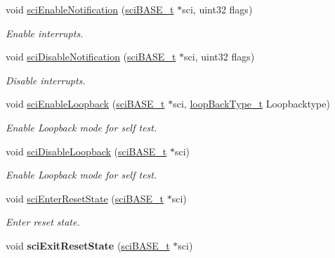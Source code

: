 \begin{DoxyCompactItemize}
void \mbox{\hyperlink{group__SCI_gad14ca1b90c313254407d318eceaa1f46}{sci\+Enable\+Notification}} (\mbox{\hyperlink{reg__sci_8h_ad5e2af74efb062728408d4ac1b7735db}{sci\+B\+A\+S\+E\+\_\+t}} $\ast$sci, uint32 flags)
\begin{DoxyCompactList}\small\item\em Enable interrupts. \end{DoxyCompactList}\item 
void \mbox{\hyperlink{group__SCI_ga9f1a39a5272682dbd101ddcbbbdc8193}{sci\+Disable\+Notification}} (\mbox{\hyperlink{reg__sci_8h_ad5e2af74efb062728408d4ac1b7735db}{sci\+B\+A\+S\+E\+\_\+t}} $\ast$sci, uint32 flags)
\begin{DoxyCompactList}\small\item\em Disable interrupts. \end{DoxyCompactList}\item 
void \mbox{\hyperlink{group__SCI_ga36302e2a67c26b3557c66ccb267c1760}{sci\+Enable\+Loopback}} (\mbox{\hyperlink{reg__sci_8h_ad5e2af74efb062728408d4ac1b7735db}{sci\+B\+A\+S\+E\+\_\+t}} $\ast$sci, \mbox{\hyperlink{sys__common_8h_aa61c8f392939c8448c7e3f17a3ecb51c}{loop\+Back\+Type\+\_\+t}} Loopbacktype)
\begin{DoxyCompactList}\small\item\em Enable Loopback mode for self test. \end{DoxyCompactList}\item 
void \mbox{\hyperlink{group__SCI_gae6568eda24f29b1b31bd09a5f665b5f8}{sci\+Disable\+Loopback}} (\mbox{\hyperlink{reg__sci_8h_ad5e2af74efb062728408d4ac1b7735db}{sci\+B\+A\+S\+E\+\_\+t}} $\ast$sci)
\begin{DoxyCompactList}\small\item\em Enable Loopback mode for self test. \end{DoxyCompactList}\item 
void \mbox{\hyperlink{group__SCI_ga695b0bd0cb87fd2a0542f784fc94aa06}{sci\+Enter\+Reset\+State}} (\mbox{\hyperlink{reg__sci_8h_ad5e2af74efb062728408d4ac1b7735db}{sci\+B\+A\+S\+E\+\_\+t}} $\ast$sci)
\begin{DoxyCompactList}\small\item\em Enter reset state. \end{DoxyCompactList}\item 
\mbox{\label{group__SCI_ga3ec6735d45ea69caf0abe5919f04d538}} 
void {\bfseries sci\+Exit\+Reset\+State} (\mbox{\hyperlink{reg__sci_8h_ad5e2af74efb062728408d4ac1b7735db}{sci\+B\+A\+S\+E\+\_\+t}} $\ast$sci)

\end{DoxyCompactItemize}
